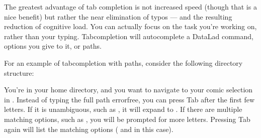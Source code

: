 \sphinxAtStartPar
The greatest advantage of tab completion is not increased speed (though that is a nice benefit)
but rather the near elimination of typos — and the resulting reduction of cognitive load.
You can actually focus on the task you’re working on, rather than your typing. Tab\sphinxhyphen{}completion
will autocomplete a DataLad command, options you give to it, or paths.

\sphinxAtStartPar
For an example of tab\sphinxhyphen{}completion with paths, consider the following directory structure:

\begin{sphinxVerbatim}[commandchars=\\\{\}]
\end{sphinxVerbatim}

\sphinxAtStartPar
You’re in your home directory, and you want to navigate to your 
comic selection in .
Instead of typing the full path error\sphinxhyphen{}free, you can press Tab after the first few letters.
If it is unambiguous, such as , it will expand to .
If there are multiple matching options, such as , you will be prompted for more letters.
Pressing Tab again will list the matching options ( and  in this case).

\sphinxAtStartPar
{}

\sphinxstepscope

\ignorespaces 

